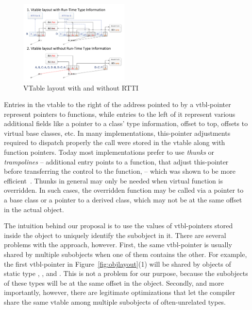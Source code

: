 \noindent
\begin{figure}[htbp]
  \centering
    \includegraphics[width=0.49\textwidth]{v-table.pdf}
  \caption{VTable layout with and without RTTI}
  \label{fig:vtbl}
\end{figure}

Entries in the vtable to the right of the address pointed to by a vtbl-pointer 
represent pointers to functions, while entries to the left of it represent 
various additional fields like a pointer to a class' type information, offset to 
top, offsets to virtual base classes, etc. In many implementations, this-pointer 
adjustments required to dispatch properly the call were stored in the vtable 
along with function pointers. Today most implementations prefer to use 
\emph{thunks} or \emph{trampolines} -- additional entry points to a function, 
that adjust this-pointer before transferring the control to the function, -- 
which was shown to be more efficient~\cite{Driesen96}. Thunks in general may 
only be needed when virtual function is overridden. In such cases, the 
overridden function may be called via a pointer to a base class or a pointer to 
a derived class, which may not be at the same offset in the actual object.

The intuition behind our proposal is to use the values of vtbl-pointers stored 
inside the object to uniquely identify the subobject in it. There are several 
problems with the approach, however. First, the same vtbl-pointer is 
usually shared by multiple subobjects when one of them contains the other. For 
example, the first vtbl-pointer in Figure~\ref{fig:objlayout}(1) will be shared 
by objects of static type , ,  and . This is 
not a problem for our purpose, because the subobjects of these types will be at 
the same offset in the object. Secondly, and more importantly, 
however, there are legitimate optimizations that let the compiler share the same 
vtable among multiple subobjects of often-unrelated types.

